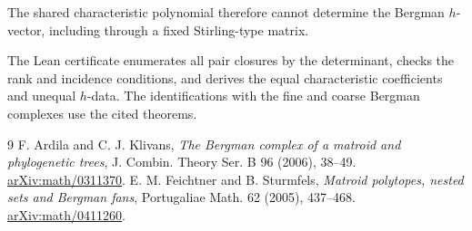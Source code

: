 \documentclass[10pt]{article}
\begin{document}
The shared characteristic polynomial therefore cannot determine the
Bergman $h$-vector, including through a fixed Stirling-type matrix.

The Lean certificate enumerates all pair closures by the determinant,
checks the rank and incidence conditions, and derives the equal
characteristic coefficients and unequal $h$-data. The identifications
with the fine and coarse Bergman complexes use the cited theorems.

\begin{thebibliography}{9}
 F. Ardila and C. J. Klivans,
\emph{The Bergman complex of a matroid and phylogenetic trees},
J. Combin. Theory Ser. B 96 (2006), 38--49.
\href{https://arxiv.org/abs/math/0311370}{arXiv:math/0311370}.
 E. M. Feichtner and B. Sturmfels,
\emph{Matroid polytopes, nested sets and Bergman fans},
Portugaliae Math. 62 (2005), 437--468.
\href{https://arxiv.org/abs/math/0411260}{arXiv:math/0411260}.
\end{thebibliography}
\end{document}
